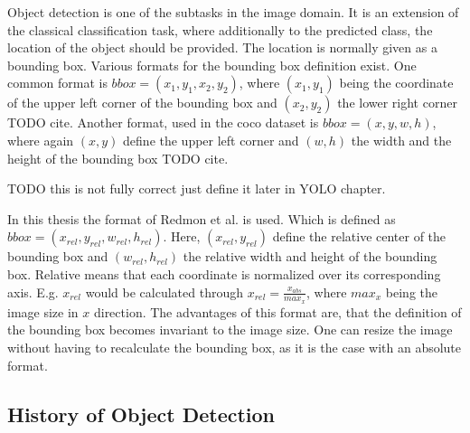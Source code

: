 Object detection is one of the subtasks in the image domain.
It is an extension of the classical classification task, where additionally to the predicted class, the location of the object should be provided.
The location is normally given as a bounding box.
Various formats for the bounding box definition exist.
One common format is $bbox = (x_1, y_1, x_2, y_2)$, where $(x_1, y_1)$ being the coordinate of the upper left corner of the bounding box and $(x_2, y_2)$ the lower right corner TODO cite.
Another format, used in the coco dataset is $bbox = (x, y, w, h)$, where again $(x, y)$ define the upper left corner and $(w, h)$ the width and the height of the bounding box TODO cite.

TODO this is not fully correct just define it later in YOLO chapter.

In this thesis the format of Redmon et al. \cite{yolov1} is used.
Which is defined as $bbox = (x_{rel}, y_{rel}, w_{rel}, h_{rel})$.
Here, $(x_{rel}, y_{rel})$ define the relative center of the bounding box and $(w_{rel}, h_{rel})$ the relative width and height of the bounding box.
Relative means that each coordinate is normalized over its corresponding axis.
E.g. $x_{rel}$ would be calculated through $x_{rel} = \frac{x_{abs}}{max_x}$, where $max_x$ being the image size in $x$ direction.
The advantages of this format are, that the definition of the bounding box becomes invariant to the image size.
One can resize the image without having to recalculate the bounding box, as it is the case with an absolute format.

\subsection{History of Object Detection}
\label{sec:hostory_obj_detection}

